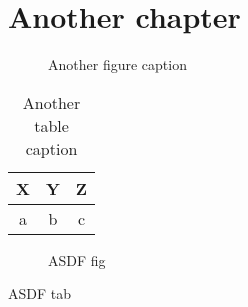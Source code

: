 \documentclass[12pt]{ucsddissertation}
\begin{document}
\Blinddocument

\setcounter{chapter}{50}
\chapter{Another chapter}
\setcounter{figure}{73}
\setcounter{table}{88}
\begin{figure}
\centering
{}
\caption{Another figure caption}
\end{figure}
\begin{table}
\centering
\caption{Another table caption}
\begin{tabular}{ccc}
\toprule
X&Y&Z\\
\midrule
a&b&c\\
\bottomrule
\end{tabular}
\end{table}
\begin{figure}
\caption{ASDF fig}
\end{figure}
\begin{table}
\caption{ASDF tab}
\end{table}

\appendix
\Blinddocument

\backmatter

\end{document}
